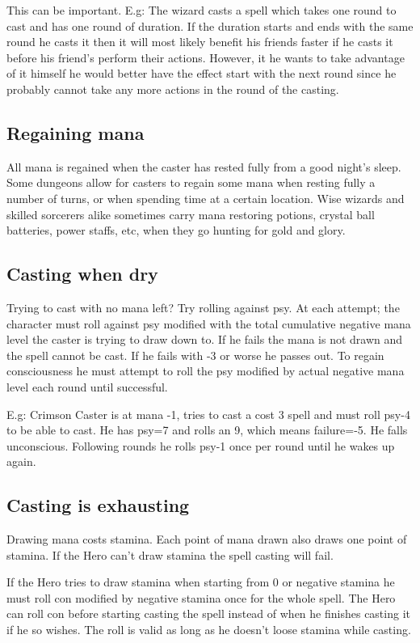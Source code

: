 This can be important. E.g: The wizard casts a spell which takes one round to cast and has one round of duration. If the duration starts and ends with the same round he casts it then it will most likely benefit his friends faster if he casts it before his friend's perform their actions. However, it he wants to take advantage of it himself he would better have the effect start with the next round since he probably cannot take any more actions in the round of the casting.


\subsection*{Regaining mana}
All mana is regained when the caster has rested fully from a good night's sleep. Some dungeons allow for casters to regain some mana when resting fully a number of turns, or when spending time at a certain location.
Wise wizards and skilled sorcerers alike sometimes carry mana restoring potions, crystal ball batteries, power staffs, etc, when they go hunting for gold and glory.


\subsection*{Casting when dry}
Trying to cast with no mana left? Try rolling against psy. At each attempt; the character must roll against psy modified with the total cumulative negative mana level the caster is trying to draw down to. If he fails the mana is not drawn and the spell cannot be cast. If he fails with -3 or worse he passes out. To regain consciousness he must attempt to roll the psy modified by actual negative mana level each round until successful.

E.g: Crimson Caster is at mana -1, tries to cast a cost 3 spell and must roll psy-4 to be able to cast. He has psy=7 and rolls an 9, which means failure=-5. He falls unconscious. Following rounds he rolls psy-1 once per round until he wakes up again.


\subsection*{Casting is exhausting}
Drawing mana costs stamina. Each point of mana drawn also draws one point of stamina. If the Hero can't draw stamina the spell casting will fail.

If the Hero tries to draw stamina when starting from 0 or negative stamina he must roll con modified by negative stamina once for the whole spell. The Hero can roll con before starting casting the spell instead of when he finishes casting it if he so wishes. The roll is valid as long as he doesn't loose stamina while casting.



